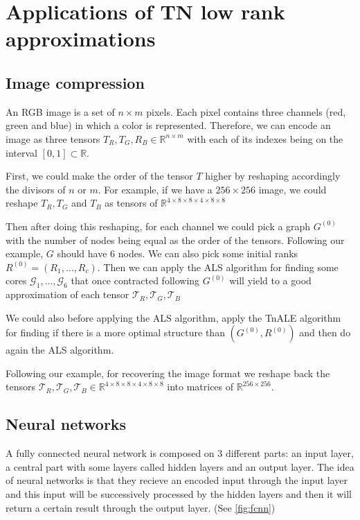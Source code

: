 \documentclass[11pt,a4paper,openright,oneside]{book}
\numberwithin{equation}{section}
\newcommand{\figref}[1]{\cref{#1}}
\begin{document}
{\chapter{Applications of TN low rank approximations}

\section{Image compression}

An RGB image is a set of $n \times m$ pixels. Each pixel contains
three channels (red, green and blue) in which a color is represented. Therefore, we can encode an image
as three tensors $T_R,T_G,R_B \in \mathbb{R}^{n \times m}$ with each of its indexes
being on the interval $[0,1] \subset \mathbb{R}$.

First, we could make the order of the tensor $T$ higher by reshaping accordingly the divisors of $n$ or $m$. For example,
if we have a $256 \times 256$ image, we could reshape $T_R, T_G$ and $T_B$ as tensors of $\mathbb{R}^{4 \times 8 \times 8 \times 4 \times 8 \times 8 }$

Then after doing this reshaping, for each channel we could pick a graph $G^{(0)}$ with the number of nodes being equal as the order of the tensors. Following our example,
$G$ should have $6$ nodes. We can also pick some initial ranks $R^{(0)} = (R_1, \dots, R_c)$. Then we can apply the ALS algorithm for
finding some cores $\mathcal{G}_1, \dots, \mathcal{G}_6$ that once contracted following $G^{(0)}$ will yield to a good approximation
of each tensor $\mathcal{T}_R, \mathcal{T}_G, \mathcal{T}_B$

We could also before applying the ALS algorithm, apply the TnALE algorithm for finding if there is a more optimal structure than $(G^{(0)}, R^{(0)})$ and
then do again the ALS algorithm.

Following our example, for recovering the image format we reshape back the tensors $\mathcal{T}_R, \mathcal{T}_G, \mathcal{T}_B \in \mathbb{R}^{4 \times 8 \times 8 \times 4 \times 8 \times 8}$
into matrices of $\mathbb{R}^{256 \times 256}$.

\section{Neural networks}

A fully connected neural network is composed on 3 different parts: an input layer, a central part with some layers 
called hidden layers and an output layer. The idea of neural networks is that they recieve an encoded input through
the input layer and this input will be successively processed by the hidden layers and then it will return a certain result
through the output layer. (See \figref{fig:fcnn})

}
\end{document}
